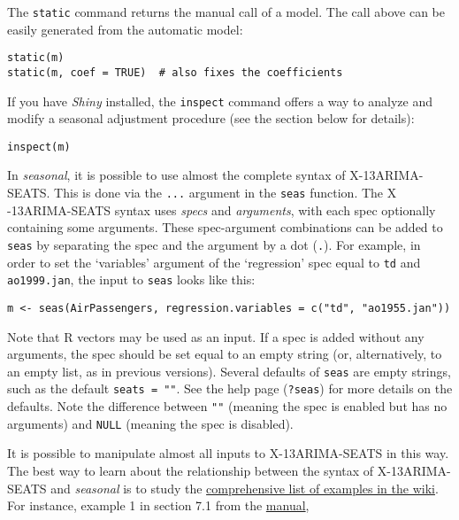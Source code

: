 The \texttt{static} command returns the manual call of a model. The call
above can be easily generated from the automatic model:

\begin{verbatim}
static(m)
static(m, coef = TRUE)  # also fixes the coefficients
\end{verbatim}

If you have \emph{Shiny} installed, the \texttt{inspect} command offers
a way to analyze and modify a seasonal adjustment procedure (see the
section below for details):

\begin{verbatim}
inspect(m)
\end{verbatim}


In \emph{seasonal}, it is possible to use almost the complete syntax of
X-13ARIMA- SEATS. This is done via the \texttt{...} argument in the
\texttt{seas} function. The X -13ARIMA-SEATS syntax uses \emph{specs}
and \emph{arguments}, with each spec optionally containing some
arguments. These spec-argument combinations can be added to
\texttt{seas} by separating the spec and the argument by a dot
(\texttt{.}). For example, in order to set the `variables' argument of
the `regression' spec equal to \texttt{td} and \texttt{ao1999.jan}, the
input to \texttt{seas} looks like this:

\begin{verbatim}
m <- seas(AirPassengers, regression.variables = c("td", "ao1955.jan"))
\end{verbatim}

Note that R vectors may be used as an input. If a spec is added without
any arguments, the spec should be set equal to an empty string (or,
alternatively, to an empty list, as in previous versions). Several
defaults of \texttt{seas} are empty strings, such as the default
\texttt{seats = ""}. See the help page (\texttt{?seas}) for more details
on the defaults. Note the difference between \texttt{""} (meaning the
spec is enabled but has no arguments) and \texttt{NULL} (meaning the
spec is disabled).

It is possible to manipulate almost all inputs to X-13ARIMA-SEATS in
this way. The best way to learn about the relationship between the
syntax of X-13ARIMA-SEATS and \emph{seasonal} is to study the
\href{https://github.com/christophsax/seasonal/wiki/Examples-of-X-13ARIMA-SEATS-in-R}{comprehensive
list of examples in the wiki}. For instance, example 1 in section 7.1
from the \href{http://www.census.gov/ts/x13as/docX13ASHTML.pdf}{manual},

